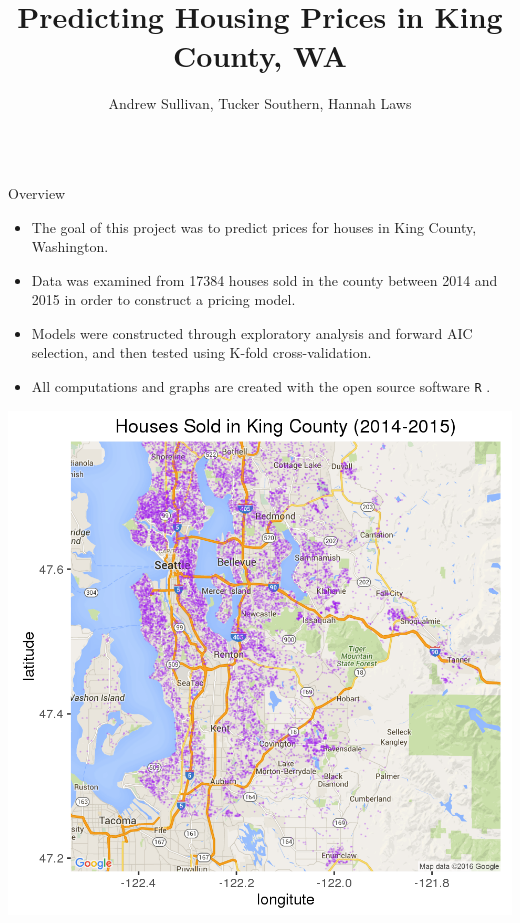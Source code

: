 \documentclass[final]{beamer}
\title{Predicting Housing Prices in King County, WA}
\author{Andrew Sullivan, Tucker Southern, Hannah Laws}
\institute{Department of Mathematical Sciences}
\begin{document}

\begin{frame}[fragile]
\vspace{-2ex}
\begin{columns}[t]


\begin{column}{0.31\linewidth}
\begin{minipage}[t][.955\textheight]{\linewidth} 
\vspace{0ex}
\begin{block}{Overview}
\begin{itemize}
\item The goal of this project was to predict prices for houses in King County, Washington.
\item Data was examined from 17384 houses sold in the county between 2014 and 2015 in order to construct a pricing model.
\item Models were constructed through exploratory analysis and forward AIC selection, and then tested using K-fold cross-validation.
\item All computations and graphs are created with the open source software \texttt{R} \cite{R-base}. 
\end{itemize}

\centering
\includegraphics{countymap.png}
\vspace{0ex}
\end{block}
\vfill


\end{minipage}
\end{column}
\end{columns}
\end{frame}
\end{document}
